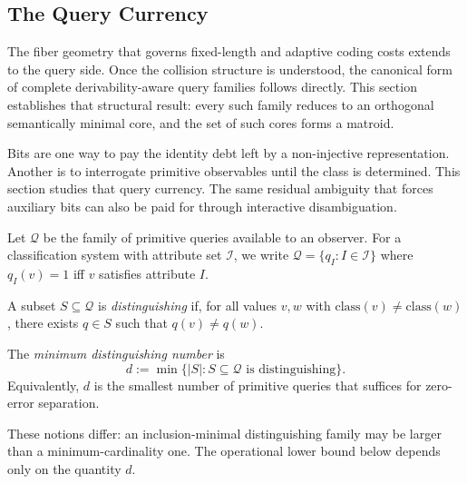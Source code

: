 \subsection{The Query Currency}

The fiber geometry that governs fixed-length and adaptive coding costs extends to the query side. Once the collision structure is understood, the canonical form of complete derivability-aware query families follows directly. This section establishes that structural result: every such family reduces to an orthogonal semantically minimal core, and the set of such cores forms a matroid.

Bits are one way to pay the identity debt left by a non-injective representation. Another is to interrogate primitive observables until the class is determined. This section studies that query currency. The same residual ambiguity that forces auxiliary bits can also be paid for through interactive disambiguation.

\begin{definition}
Let $\mathcal Q$ be the family of primitive queries available to an observer. For a classification system with attribute set $\mathcal I$, we write $\mathcal Q = \{q_I : I \in \mathcal I\}$ where $q_I(v)=1$ iff $v$ satisfies attribute $I$.
\end{definition}

\begin{definition}
A subset $S \subseteq \mathcal Q$ is \emph{distinguishing} if, for all values $v,w$ with $\mathrm{class}(v) \ne \mathrm{class}(w)$, there exists $q \in S$ such that $q(v) \ne q(w)$.
\end{definition}

\begin{definition}\label{def:distinguishing-dimension}
The \emph{minimum distinguishing number} is
\[
d := \min\{|S| : S \subseteq \mathcal Q \text{ is distinguishing}\}.
\]
Equivalently, $d$ is the smallest number of primitive queries that suffices for zero-error separation.
\end{definition}

\begin{remark}
These notions differ: an inclusion-minimal distinguishing family may be larger than a minimum-cardinality one. The operational lower bound below depends only on the quantity $d$.
\end{remark}

